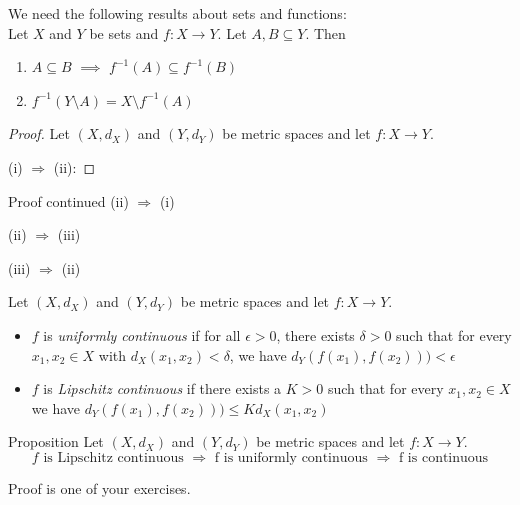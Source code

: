 \documentclass [aspectratio=169]{beamer}
\newcommand{\inv}{{-1}}
\begin{document}
\begin{frame}
We need the following results about sets and functions: \\
Let $X$ and $Y$ be sets and $f:X \to Y$. Let $A,B \subseteq Y$. Then 
\begin{enumerate}
\item $A \subseteq B$ $\implies$ $f^\inv(A) \subseteq f^\inv(B)$
\item $f^\inv(Y \setminus A) = X \setminus f^\inv(A)$
\end{enumerate}

\begin{proof}
Let $(X,d_X)$ and $(Y,d_Y)$ be metric spaces and let $f:X\to Y$.

(i) $\Rightarrow$ (ii): 

\vspace{3cm}


\end{proof}

\end{frame}


\begin{frame}

\begin{block}{Proof continued}
(ii) $\Rightarrow$ (i)

\vspace{3cm}
(ii) $\Rightarrow$ (iii)

\vspace{1cm}
(iii) $\Rightarrow$ (ii) 
\vspace{0.5cm}
\end{block}
\end{frame}



\begin{frame}
\begin{definition}
Let $(X,d_X)$ and $(Y,d_Y)$ be metric spaces and let $f:X\to Y$. 
\begin{itemize}
    \item $f$ is \emph{uniformly continuous} if for all $\epsilon>0$, there exists $\delta > 0$ such that for every $x_1,x_2\in X$ with $d_X(x_1,x_2) < \delta$, we have  $d_Y(f(x_1),f(x_2))) < \epsilon$ 
    \item $f$ is \emph{Lipschitz continuous} if there exists a $K > 0$ such that for every $x_1,x_2\in X$ we have  $d_Y(f(x_1),f(x_2))) \leq K d_X(x_1,x_2)$
\end{itemize}
\end{definition}

\begin{exampleblock}{Proposition}
Let $(X,d_X)$ and $(Y,d_Y)$ be metric spaces and let $f:X\to Y$. 
$$f \text{ is Lipschitz continuous } \Rightarrow \text{ f is uniformly continuous } \Rightarrow \text{ f is continuous}$$
\end{exampleblock}
Proof is one of your exercises.
\end{frame}
\end{document}
